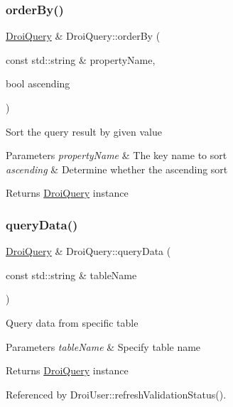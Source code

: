 \subsubsection{\texorpdfstring{order\+By()}{orderBy()}}
{\footnotesize\ttfamily \hyperlink{class_droi_query}{Droi\+Query} \& Droi\+Query\+::order\+By (\begin{DoxyParamCaption}\item[{const std\+::string \&}]{property\+Name,  }\item[{bool}]{ascending }\end{DoxyParamCaption})}

Sort the query result by given value 
\begin{DoxyParams}{Parameters}
{\em property\+Name} & The key name to sort \\
\hline
{\em ascending} & Determine whether the ascending sort \\
\hline
\end{DoxyParams}
\begin{DoxyReturn}{Returns}
\hyperlink{class_droi_query}{Droi\+Query} instance 
\end{DoxyReturn}
\mbox{\label{class_droi_query_a73a7402ccf8fd761313c38e45890aa25}} 
\subsubsection{\texorpdfstring{query\+Data()}{queryData()}}
{\footnotesize\ttfamily \hyperlink{class_droi_query}{Droi\+Query} \& Droi\+Query\+::query\+Data (\begin{DoxyParamCaption}\item[{const std\+::string \&}]{table\+Name }\end{DoxyParamCaption})}

Query data from specific table 
\begin{DoxyParams}{Parameters}
{\em table\+Name} & Specify table name \\
\hline
\end{DoxyParams}
\begin{DoxyReturn}{Returns}
\hyperlink{class_droi_query}{Droi\+Query} instance 
\end{DoxyReturn}


Referenced by Droi\+User\+::refresh\+Validation\+Status().

\mbox{\label{class_droi_query_ab66d0b568d69f579e4fdf9ac77d6c6b4}} 
